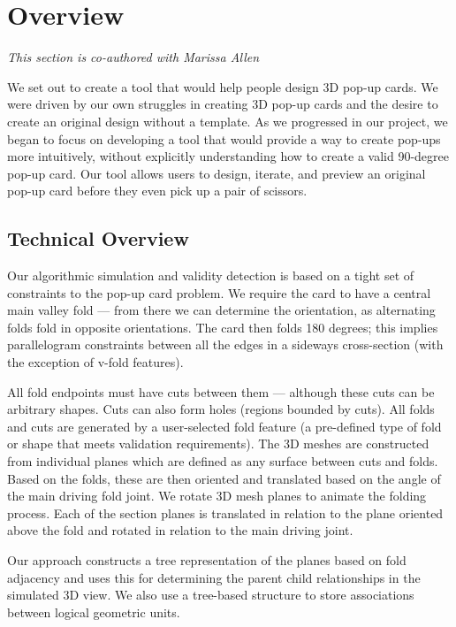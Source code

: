\section{Overview}\label{overview}

\emph{This section is co-authored with Marissa Allen}

We set out to create a tool that would help people design 3D pop-up
cards. We were driven by our own struggles in creating 3D pop-up cards
and the desire to create an original design without a template. As we
progressed in our project, we began to focus on developing a tool that
would provide a way to create pop-ups more intuitively, without
explicitly understanding how to create a valid 90-degree pop-up card.
Our tool allows users to design, iterate, and preview an original pop-up
card before they even pick up a pair of scissors.

\subsection{Technical Overview}\label{technical-overview}

Our algorithmic simulation and validity detection is based on a tight
set of constraints to the pop-up card problem. We require the card to
have a central main valley fold --- from there we can determine the
orientation, as alternating folds fold in opposite orientations. The
card then folds 180 degrees; this implies parallelogram constraints
between all the edges in a sideways cross-section (with the exception of
v-fold features).

All fold endpoints must have cuts between them --- although these cuts
can be arbitrary shapes. Cuts can also form holes (regions bounded by
cuts). All folds and cuts are generated by a user-selected fold feature
(a pre-defined type of fold or shape that meets validation
requirements). The 3D meshes are constructed from individual planes
which are defined as any surface between cuts and folds. Based on the
folds, these are then oriented and translated based on the angle of the
main driving fold joint. We rotate 3D mesh planes to animate the folding
process. Each of the section planes is translated in relation to the
plane oriented above the fold and rotated in relation to the main
driving joint.

Our approach constructs a tree representation of the planes based on
fold adjacency and uses this for determining the parent child
relationships in the simulated 3D view. We also use a tree-based
structure to store associations between logical geometric units.

